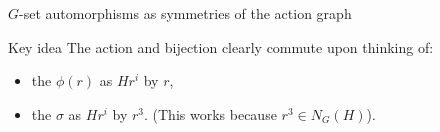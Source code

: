 \documentclass[8pt, handout]{beamer}
\begin{document}
\begin{frame}{$G$-set automorphisms as symmetries of the action graph}
  \vspace{-1mm}
  
  \begin{alertblock}{Key idea}
    The action and bijection clearly commute upon thinking of:
    \begin{itemize}
    \item the  $\phi(r)$ as 
      $Hr^i$ by $r$,
    \item the  $\sigma$ as 
      $Hr^i$ by $r^3$. (This works because $r^3\in N_G(H)$).
    \end{itemize}
  \end{alertblock}
  
\end{frame}

\end{document}
